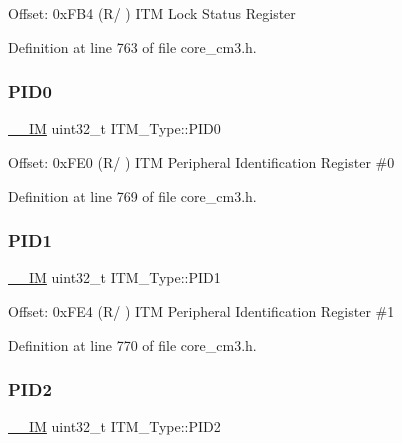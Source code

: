 Offset\+: 0x\+F\+B4 (R/ ) I\+TM Lock Status Register 

Definition at line 763 of file core\+\_\+cm3.\+h.

\mbox{\label{struct_i_t_m___type_ab4a4cc97ad658e9c46cf17490daffb8a}} 
\subsubsection{\texorpdfstring{P\+I\+D0}{PID0}}
{\footnotesize\ttfamily \hyperlink{core__sc300_8h_a4cc1649793116d7c2d8afce7a4ffce43}{\+\_\+\+\_\+\+IM} uint32\+\_\+t I\+T\+M\+\_\+\+Type\+::\+P\+I\+D0}

Offset\+: 0x\+F\+E0 (R/ ) I\+TM Peripheral Identification Register \#0 

Definition at line 769 of file core\+\_\+cm3.\+h.

\mbox{\label{struct_i_t_m___type_a89ea1d805a668d6589b22d8e678eb6a4}} 
\subsubsection{\texorpdfstring{P\+I\+D1}{PID1}}
{\footnotesize\ttfamily \hyperlink{core__sc300_8h_a4cc1649793116d7c2d8afce7a4ffce43}{\+\_\+\+\_\+\+IM} uint32\+\_\+t I\+T\+M\+\_\+\+Type\+::\+P\+I\+D1}

Offset\+: 0x\+F\+E4 (R/ ) I\+TM Peripheral Identification Register \#1 

Definition at line 770 of file core\+\_\+cm3.\+h.

\mbox{\label{struct_i_t_m___type_a8471c4d77b7107cf580587509da69f38}} 
\subsubsection{\texorpdfstring{P\+I\+D2}{PID2}}
{\footnotesize\ttfamily \hyperlink{core__sc300_8h_a4cc1649793116d7c2d8afce7a4ffce43}{\+\_\+\+\_\+\+IM} uint32\+\_\+t I\+T\+M\+\_\+\+Type\+::\+P\+I\+D2}

